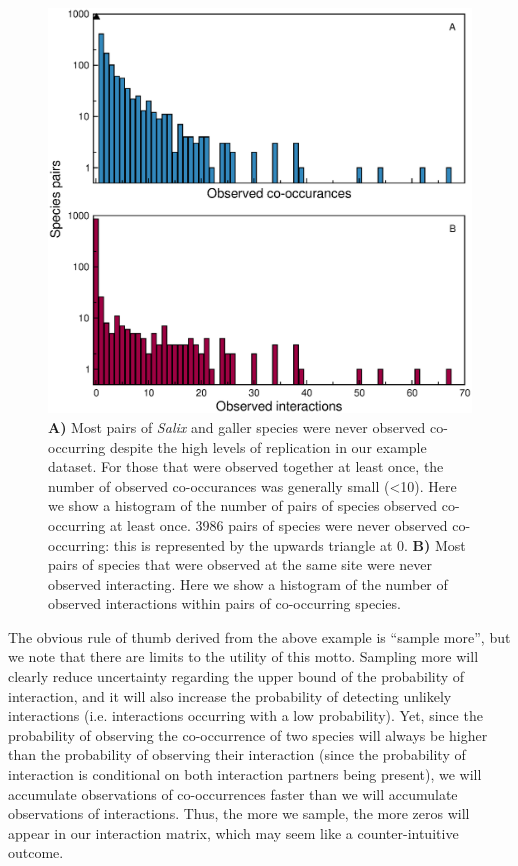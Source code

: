 \documentclass[12pt]{article}
\begin{document}
  \begin{figure}
    \caption{\textbf{A)} Most pairs of \emph{Salix} and galler species were never observed co-occurring despite the high levels of replication in our example dataset. For those that were observed together at least once, the number of observed co-occurances was generally small (\textless10). Here we show a histogram of the number of pairs of species observed co-occurring at least once. 3986 pairs of species were never observed co-occurring: this is represented by the upwards triangle at 0. \textbf{B)} Most pairs of species that were observed at the same site were never observed interacting. Here we show a histogram of the number of observed interactions within pairs of co-occurring species.}
    \label{histograms}
    \includegraphics*[width=.8\textwidth]{figures/Salix_Galler_histogram.eps}
    \end{figure}


  The obvious rule of thumb derived from the above example is “sample more”, but we note that there are limits to the utility of this motto. Sampling more will clearly reduce uncertainty regarding the upper bound of the probability of interaction, and it will also increase the probability of detecting unlikely interactions (i.e. interactions occurring with a low probability). Yet, since the probability of observing the co-occurrence of two species will always be higher than the probability of observing their interaction (since the probability of interaction is conditional on both interaction partners being present), we will accumulate observations of co-occurrences faster than we will accumulate observations of interactions. Thus, the more we sample, the more zeros will appear in our interaction matrix, which may seem like a counter-intuitive outcome.
\end{document}
